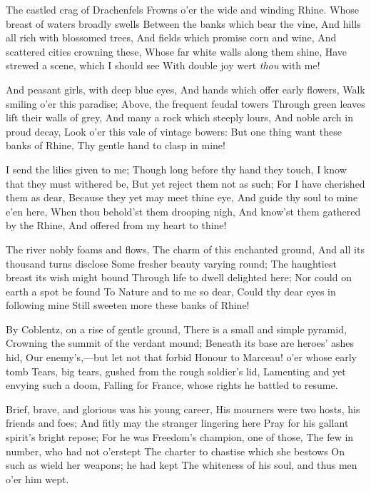 \documentclass[10pt,twocolumn]{book}
\begin{document}
{
  \Forma {}
  \Facies          {\strophe}

   The castled crag of Drachenfels
   Frowns o'er the wide and winding Rhine.
   Whose breast of waters broadly swells
   Between the banks which bear the vine,
   And hills all rich with blossomed trees,
   And fields which promise corn and wine,
   And scattered cities crowning these,
   Whose far white walls along them shine,
   Have strewed a scene, which I should see
   With double joy wert \textit{thou} with me!

   And peasant girls, with deep blue eyes,
   And hands which offer early flowers,
   Walk smiling o'er this paradise;
   Above, the frequent feudal towers
   Through green leaves lift their walls of grey,
   And many a rock which steeply lours,
   And noble arch in proud decay,
   Look o'er this vale of vintage bowers:
   But one thing want these banks of Rhine,\textemdash
   Thy gentle hand to clasp in mine!

   I send the lilies given to me;
   Though long before thy hand they touch,
   I know that they must withered be,
   But yet reject them not as such;
   For I have cherished them as dear,
   Because they yet may meet thine eye,
   And guide thy soul to mine e'en here,
   When thou behold'st them drooping nigh,
   And know'st them gathered by the Rhine,
   And offered from my heart to thine!

   The river nobly foams and flows,
   The charm of this enchanted ground,
   And all its thousand turns disclose
   Some fresher beauty varying round;
   The haughtiest breast its wish might bound
   Through life to dwell delighted here;
   Nor could on earth a spot be found
   To Nature and to me so dear,
   Could thy dear eyes in following mine
   Still sweeten more these banks of Rhine!

}

   By Coblentz, on a rise of gentle ground,
   There is a small and simple pyramid,
   Crowning the summit of the verdant mound;
   Beneath its base are heroes' ashes hid,
   Our enemy's,---but let not that forbid
   Honour to Marceau! o'er whose early tomb
   Tears, big tears, gushed from the rough soldier's lid,
   Lamenting and yet envying such a doom,
Falling for France, whose rights he battled to resume.


   Brief, brave, and glorious was his young career,\textemdash
   His mourners were two hosts, his friends and foes;
   And fitly may the stranger lingering here
   Pray for his gallant spirit's bright repose;
   For he was Freedom's champion, one of those,
   The few in number, who had not o'erstept
   The charter to chastise which she bestows
   On such as wield her weapons; he had kept
The whiteness of his soul, and thus men o'er him wept.
\end{document}
